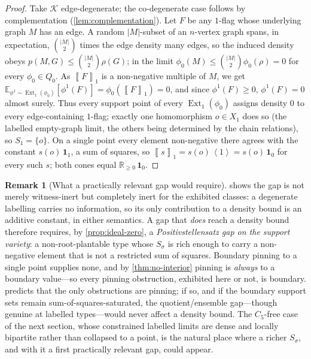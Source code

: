 \documentclass[11pt]{article}
\theoremstyle{definition}
\newtheorem{remark}[theorem]{Remark}
\newcommand{\R}{\mathbb{R}}
\newcommand{\E}{\mathbb{E}}
\newcommand{\K}{\mathcal{K}}
\newcommand{\Ext}{\operatorname{Ext}}
\newcommand{\brak}[1]{\left\langle #1\right\rangle}
\newcommand{\avg}[2]{\left\llbracket #1 \right\rrbracket_{#2}}
\newcommand{\one}{\mathbf 1}
\begin{document}
\begin{proof}
Take $\K$ edge-degenerate; the co-degenerate case follows by complementation
(\cref{lem:complementation}).  Let $F$ be any $1$-flag whose underlying graph $M$ has an
edge.  A random $|M|$-subset of an $n$-vertex graph spans, in expectation,
$\binom{|M|}{2}$ times the edge density many edges, so the induced density obeys
$p(M,G)\le\binom{|M|}{2}\rho(G)$; in the limit
$\phi_0(M)\le\binom{|M|}2\phi_0(\rho)=0$ for every $\phi_0\in Q_0$.  As $\avg{F}{1}$ is a
non-negative multiple of $M$, we get
$\E_{\phi^1\sim\Ext_1(\phi_0)}[\phi^1(F)]=\phi_0(\avg{F}{1})=0$, and since
$\phi^1(F)\ge0$, $\phi^1(F)=0$ almost surely.  Thus every support point of every
$\Ext_1(\phi_0)$ assigns density $0$ to every edge-containing $1$-flag; exactly one
homomorphism $o\in X_1$ does so (the labelled empty-graph limit, the others being
determined by the chain relations), so $S_1=\{o\}$.  On a single point every element
non-negative there agrees with the constant $s(o)\,\one_1$, a sum of squares, so
$\avg{s}{1}=s(o)\,\brak1=s(o)\,\one_0$ for every such $s$; both cones equal
$\R_{\ge0}\,\one_0$.
\end{proof}

\begin{remark}[What a practically relevant gap would require]
 shows the gap is not merely witness-inert but completely inert
for the exhibited classes: a degenerate labelling carries no information, so its only
contribution to a density bound is an additive constant, in either semantics.  A gap
that \emph{does} reach a density bound therefore requires, by \cref{prop:ideal-zero}, a
\emph{Positivstellensatz gap on the support variety}: a non-root-plantable type whose
$S_\sigma$ is rich enough to carry a non-negative element that is not a restricted sum of
squares.  Boundary pinning to a single point supplies none, and by
\cref{thm:no-interior} pinning is \emph{always} to a boundary value---so every pinning
obstruction, exhibited here or not, is boundary.   predicts
that the only obstructions are pinning; if so, and if the boundary support sets remain
sum-of-squares-saturated, the quotient/ensemble gap---though genuine at labelled
types---would never affect a density bound.  The $C_5$-free case of the next section,
whose constrained labelled limits are dense and locally bipartite rather than collapsed to a
point, is the natural place where a richer $S_\sigma$, and with it a first practically
relevant gap, could appear.
\end{remark}
\end{document}
